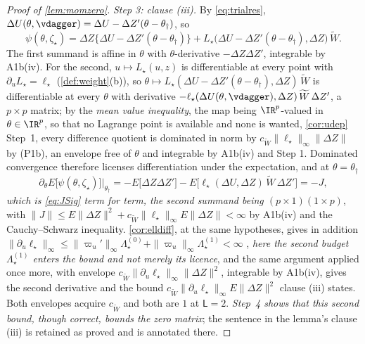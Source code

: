 \begin{proof}[Proof of \cref{lem:momzero}]
\emph{Step 3: clause \textup{(iii)}.} By \eqref{eq:trialres},
$\Delta U(\theta,\vdagger)=\Delta U-\Delta Z'(\theta-\theta_\dagger)$, so
\[
\psi(\theta,\zeta_\star)=\Delta Z\big\{\Delta U-\Delta Z'(\theta-\theta_\dagger)\big\}
+L_\star\big(\Delta U-\Delta Z'(\theta-\theta_\dagger),\Delta Z\big)\,\widetilde W .
\]
The first summand is affine in $\theta$ with $\theta$-derivative $-\Delta Z\Delta Z'$, integrable by A1b(iv).
For the second, $u\mapsto L_\star(u,z)$ is differentiable at every point with
$\partial_uL_\star=\ell_\star$ (\cref{def:weight}(b)), so
$\theta\mapsto L_\star(\Delta U-\Delta Z'(\theta-\theta_\dagger),\Delta Z)\,\widetilde W$ is
differentiable at every
$\theta$ with derivative $-\ell_\star(\Delta U(\theta,\vdagger),\Delta Z)\,\widetilde W\,\Delta Z'$, a
$p\times p$ matrix; by the \emph{mean value inequality}, the map being $\IR^{p}$-valued in
$\theta\in\IR^{p}$, so that no Lagrange point is available and none is wanted, \cref{cor:udep} Step~1, 
every difference quotient is dominated in norm by
$c_{\widetilde W}\|\ell_\star\|_\infty\|\Delta Z\|$ by \textup{(P1b)}, an envelope free of $\theta$ and
integrable by A1b(iv) and Step 1.
Dominated convergence therefore licenses differentiation under the expectation, and at
$\theta=\theta_\dagger$
\[
\partial_\theta E\big[\psi(\theta,\zeta_\star)\big]\big|_{\theta_\dagger}
=-E\big[\Delta Z\Delta Z'\big]-E\big[\ell_\star(\Delta U,\Delta Z)\,\widetilde W\,\Delta Z'\big]=-J ,
\]
\emph{which is \eqref{eq:JSig} term for term, the second summand being $(p\times1)(1\times p)$},
with $\|J\|\le E\|\Delta Z\|^{2}+c_{\widetilde W}\|\ell_\star\|_\infty E\|\Delta Z\|<\infty$ by A1b(iv) and the
Cauchy--Schwarz inequality. \cref{cor:elldiff}, at the same hypotheses, gives in addition
$\|\partial_u\ell_\star\|_\infty\le\|\varpi_u'\|_\infty\Lambda^{(0)}_\star+\|\varpi_u\|_\infty\Lambda^{(1)}_\star<\infty$
, \emph{here the second budget $\Lambda^{(1)}_\star$ enters the bound and not merely its licence}, and
the same argument applied once more, with envelope
$c_{\widetilde W}\|\partial_u\ell_\star\|_\infty\|\Delta Z\|^{2}$,
integrable by A1b(iv), gives the second derivative and the bound
$c_{\widetilde W}\|\partial_u\ell_\star\|_\infty E\|\Delta Z\|^{2}$ clause \textup{(iii)} states.
Both envelopes acquire $c_{\widetilde W}$ and both are $1$ at $\mathsf L=2$. \emph{Step~4 shows that this second
bound, though correct, bounds the zero matrix}; the sentence in the lemma's clause \textup{(iii)} is
retained as proved and is annotated there.


\end{proof}
